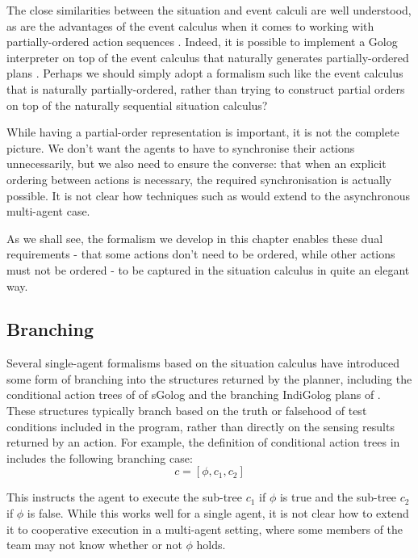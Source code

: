 The close similarities between the situation and event calculi are
well understood, as are the advantages of the event calculus when
it comes to working with partially-ordered action sequences \citep{belleghem97sitcalc_evtcalc}.
Indeed, it is possible to implement a Golog interpreter on top of
the event calculus that naturally generates partially-ordered plans
\citep{pereira04ec_golog}. Perhaps we should simply adopt a formalism
such like the event calculus that is naturally partially-ordered,
rather than trying to construct partial orders on top of the naturally
sequential situation calculus?

While having a partial-order representation is important, it is not
the complete picture. We don't want the agents to have to synchronise
their actions unnecessarily, but we also need to ensure the converse:
that when an explicit ordering between actions is necessary, the required
synchronisation is actually possible. It is not clear how techniques
such as \citep{pereira04ec_golog} would extend to the asynchronous
multi-agent case.

As we shall see, the formalism we develop in this chapter enables
these dual requirements - that some actions don't need to be ordered,
while other actions must not be ordered - to be captured in the situation
calculus in quite an elegant way.


\subsection{Branching}

Several single-agent formalisms based on the situation calculus have
introduced some form of branching into the structures returned by
the planner, including the conditional action trees of of sGolog \citep{lakemeyer99golog_cats}
and the branching IndiGolog plans of \citep{giacomo04sem_delib_indigolog}.
These structures typically branch based on the truth or falsehood
of test conditions included in the program, rather than directly on
the sensing results returned by an action. For example, the definition
of conditional action trees in \citep{lakemeyer99golog_cats} includes
the following branching case:\[
c=[\phi,c_{1},c_{2}]\]


This instructs the agent to execute the sub-tree $c_{1}$ if $\phi$
is true and the sub-tree $c_{2}$ if $\phi$ is false. While this
works well for a single agent, it is not clear how to extend it to
cooperative execution in a multi-agent setting, where some members
of the team may not know whether or not $\phi$ holds.


